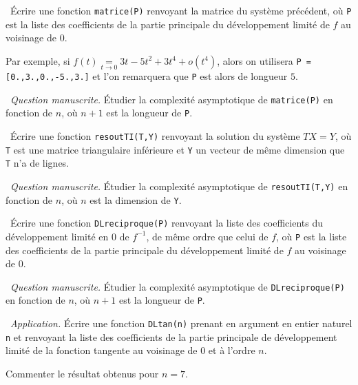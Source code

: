 \medskip

\question\ Écrire une fonction \texttt{matrice(P)} renvoyant la matrice du système précédent, où \texttt{P} est la liste des coefficients de la partie principale du développement limité de $f$ au voisinage de $0$.

Par exemple, si $f(t) \underset{t\to0}{=} 3t - 5t^2 + 3t^4 + o(t^4)$, alors on utilisera \texttt{P = [0.,3.,0.,-5.,3.]} et l'on remarquera que \texttt{P} est alors de longueur $5$.

\medskip

\question\ \emph{Question manuscrite.} Étudier la complexité asymptotique de \texttt{matrice(P)} en fonction de $n$, où $n+1$ est la longueur de \texttt{P}. 

\medskip

\question\ Écrire une fonction \texttt{resoutTI(T,Y)} renvoyant la solution du système $TX=Y$, où \texttt{T} est une matrice triangulaire inférieure et \texttt{Y} un vecteur de même dimension que \texttt{T} n'a de lignes. 

\medskip

\question\ \emph{Question manuscrite.} Étudier la complexité asymptotique de \texttt{resoutTI(T,Y)} en fonction de $n$, où $n$ est la dimension de \texttt{Y}. 

\medskip

\question\ Écrire une fonction \texttt{DLreciproque(P)} renvoyant la liste des coefficients du développement limité en $0$ de $f^{-1}$, de même ordre que celui de $f$, où \texttt{P} est la liste des coefficients de la partie principale du développement limité de $f$ au voisinage de $0$.

\medskip

\question\ \emph{Question manuscrite.} Étudier la complexité asymptotique de \texttt{DLreciproque(P)} en fonction de $n$, où $n+1$ est la longueur de \texttt{P}.  

\medskip

\question\ \emph{Application.} Écrire une fonction \texttt{DLtan(n)} prenant en argument en entier naturel \texttt{n} et renvoyant la liste des coefficients de la partie principale de développement limité de la fonction tangente au voisinage de $0$ et à l'ordre $n$. 

Commenter le résultat obtenus pour $n=7$. 